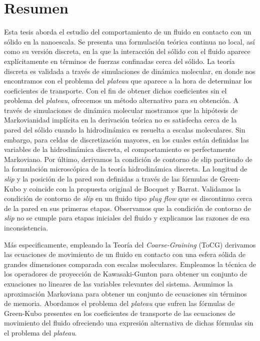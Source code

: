 \documentclass[b5paper,openright,10pt]{book}
\begin{document}
\chapter*{Resumen} %
Esta tesis aborda el estudio del comportamiento de un fluido en contacto con un sólido en la nanoescala. 
Se presenta una formulación teórica continua no local, así como su versión discreta, en la que la interacción del sólido con el fluido aparece explícitamente en términos de fuerzas confinadas cerca del sólido. 
La teoría discreta es validada a través de simulaciones de dinámica molecular, en donde nos encontramos con el problema del \textit{plateau} que aparece a la hora de determinar los coeficientes de transporte. 
Con el fin de obtener dichos coeficientes sin el problema del \textit{plateau}, ofrecemos un método alternativo para su obtención. 
A través de simulaciones de dinámica molecular mostramos que la hipótesis de Markovianidad implícita en la derivación teórica no es satisfecha cerca de la pared del sólido cuando la hidrodinámica es resuelta a escalas moleculares. Sin embargo, para celdas de discretización mayores, en los cuales están definidas las variables de la hidrodinámica discreta, el comportamiento es perfectamente Markoviano. Por último, derivamos la condición de contorno de slip partiendo de la formulación microscópica de la teoría hidrodinámica discreta. La longitud de \textit{slip} y la posición de la pared son definidas a través de las fórmulas de Green-Kubo y coincide con la propuesta original de Bocquet y Barrat. Validamos la condición de contorno de \textit{slip} en un fluido tipo \textit{plug flow} que es discontinuo cerca de la pared en sus primeras etapas. Observamos que la condición de contorno de \textit{slip} no se cumple para etapas iniciales del fluido y explicamos las razones de esa inconsistencia. 

Más especificamente, empleando la Teoría del \textit{Coarse-Graining} (ToCG) derivamos las ecuaciones de movimiento de un fluido en contacto con una esfera sólida de grandes dimensiones comparada con escalas moleculares. Empleamos la técnica de los operadores de proyección de Kawasaki-Gunton  para obtener un conjunto de exuaciones no lineares de las variables relevantes del sistema. Asumimos la aproximación Markoviana para obtener un conjunto de ecuaciones sin términos de memoria. 
Abordamos el problema del \textit{plateau} que sufren las fórmulas de Green-Kubo presentes en los coeficientes de transporte de las ecuaciones de movimiento del fluido ofreciendo una expresión alternativa de dichas fórmulas sin el problema del \textit{plateau}.  
\end{document}
